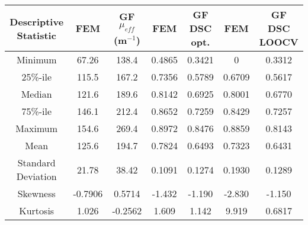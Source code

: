 \documentclass[12pt]{article}
\newcommand{\eqn}[1]{(\ref{#1})}
\newcommand{\numberofpatientsLOOCV}{22 }
\newif\iflatextortf
\begin{document}
\iflatextortf 
\else
\begin{table*}[p]
\caption{Here are the descriptive statistics for $\mu_\textit{eff}$ during optimization
and DSC performance during optimization and LOOCV (\textit{N} = \numberofpatientsLOOCV).
The transient solve of the Pennes bioheat equation
using the Arrhenius damage, Equation~\eqn{ArrheniusDamage}, is denoted FEM.
Steady state analysis using the \SI{57}{\degreeCelsius} isotherm damage model is denoted GF.
Note that all DSC, skewness, and kurtosis quantities are unitless.
``\%-ile" refers to percentiles. \textit{E.g.}, 25\%-ile means the dataset's DSC performance exceeds
25\% of the population DSC values in ranked order.
}\label{DescriptiveStatistics}
\centering 
\begin{tabular}{c|cc|cc|cc} \hline 
Descriptive Statistic & FEM           & GF $\mu_\textit{eff}$ (m$^{-1}$) & FEM         & GF DSC opt. & FEM            & GF DSC LOOCV \\ \hline
      Minimum         &    67.26      & 138.4                            &   0.4865    &     0.3421   &      0        &    0.3312    \\ %
      25\%-ile        &    115.5      & 167.2                            &   0.7356    &     0.5789   &      0.6709   &    0.5617    \\ %
      Median          &    121.6      & 189.6                            &   0.8142    &     0.6925   &      0.8001   &    0.6770    \\ %
      75\%-ile        &    146.1      & 212.4                            &   0.8652    &     0.7259   &      0.8429   &    0.7257    \\ %
      Maximum         &    154.6      & 269.4                            &   0.8972    &     0.8476   &      0.8859   &    0.8143    \\ \hline
      Mean            &    125.6      & 194.7                            &   0.7824    &     0.6493   &      0.7323   &    0.6431    \\ %
  Standard Deviation  &    21.78      & 38.42                            &   0.1091    &     0.1274   &      0.1930   &    0.1289    \\ \hline
      Skewness        &    -0.7906    & 0.5714                           &   -1.432    &     -1.190   &      -2.830   &    -1.150    \\ %
      Kurtosis        &    1.026      & -0.2562                          &   1.609     &     1.142    &      9.919    &    0.6817    \\ %
\end{tabular}
\end{table*}
\fi
\end{document}
